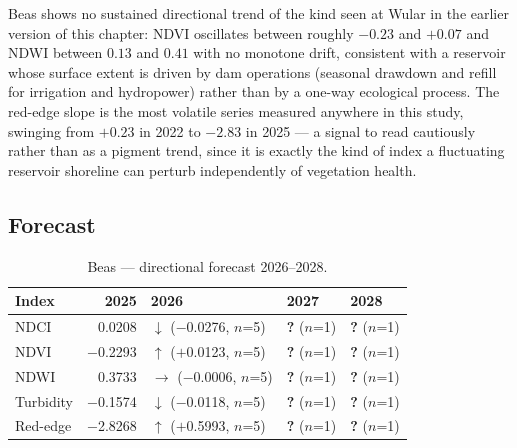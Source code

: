 \documentclass[12pt,a4paper,oneside]{report}
\begin{document}
Beas shows no sustained directional trend of the kind seen at Wular
in the earlier version of this chapter: NDVI oscillates between
roughly $-0.23$ and $+0.07$ and NDWI between $0.13$ and $0.41$ with
no monotone drift, consistent with a reservoir whose surface extent
is driven by dam operations (seasonal drawdown and refill for
irrigation and hydropower) rather than by a one-way ecological
process. The red-edge slope is the most volatile series measured
anywhere in this study, swinging from $+0.23$ in 2022 to $-2.83$ in
2025 --- a signal to read cautiously rather than as a pigment trend,
since it is exactly the kind of index a fluctuating reservoir
shoreline can perturb independently of vegetation health.

\subsection{Forecast}
\label{sec:beas_forecast_note}

\begin{table}[H]
\centering
\caption{Beas --- directional forecast 2026--2028.}
\label{tab:beas_fc}
\begin{tabular}{lrlll}
\toprule
Index & 2025 & 2026 & 2027 & 2028 \\
\midrule
NDCI & 0.0208 & $\downarrow$ ($-$0.0276, $n$=5) & \textbf{?} ($n$=1) & \textbf{?} ($n$=1) \\
NDVI & $-$0.2293 & $\uparrow$ ($+$0.0123, $n$=5) & \textbf{?} ($n$=1) & \textbf{?} ($n$=1) \\
NDWI & 0.3733 & $\rightarrow$ ($-$0.0006, $n$=5) & \textbf{?} ($n$=1) & \textbf{?} ($n$=1) \\
Turbidity & $-$0.1574 & $\downarrow$ ($-$0.0118, $n$=5) & \textbf{?} ($n$=1) & \textbf{?} ($n$=1) \\
Red-edge & $-$2.8268 & $\uparrow$ ($+$0.5993, $n$=5) & \textbf{?} ($n$=1) & \textbf{?} ($n$=1) \\
\bottomrule
\end{tabular}
\end{table}
\end{document}
